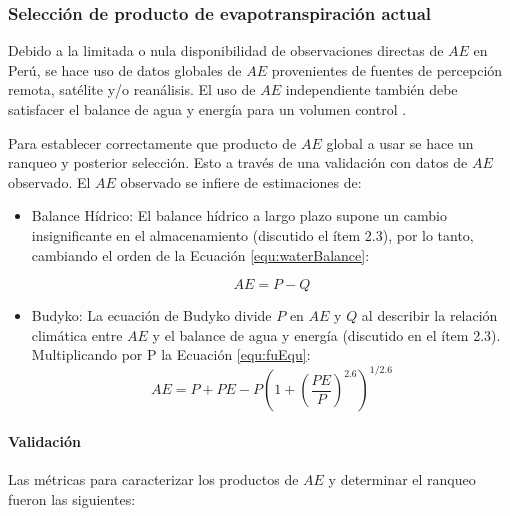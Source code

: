 \documentclass[12pt]{article}
\begin{document}
\clearpage


\thispagestyle{empty}

\subsubsection{Selección de producto de evapotranspiración actual}

Debido a la limitada o nula disponibilidad de observaciones directas de $AE$ en Perú, se hace uso de datos globales de $AE$ provenientes de fuentes de percepción remota, satélite y/o reanálisis. El uso de $AE$ independiente también debe satisfacer el balance de agua y energía para un volumen control \citep{Singh2015}.

Para establecer correctamente que producto de $AE$ global a usar se hace un ranqueo y posterior selección. Esto a través de una validación con datos de $AE$ observado. El $AE$ observado se infiere de estimaciones de:

\begin{itemize}

	\item Balance Hídrico: El balance hídrico a largo plazo supone un cambio insignificante en el almacenamiento (discutido el ítem 2.3), por lo tanto, cambiando el orden de la Ecuación \ref{equ:waterBalance}:
	
	\begin{equation}
    AE = P - Q
    \label{equ:bheq}
    \end{equation}

	\item Budyko: La ecuación de Budyko divide $P$ en $AE$ y $Q$ al describir la relación climática entre $AE$ y el balance de agua y energía (discutido en el ítem 2.3). Multiplicando por P la Ecuación \ref{equ:fuEqu}:
    \begin{equation}
    AE = P + PE - P\left (1 + \left ( \frac{PE}{P} \right )^{2.6}  \right )^{1/2.6}
    \end{equation}
	
\end{itemize}


\paragraph{Validación}\mbox{}

Las métricas para caracterizar los productos de $AE$ y determinar el ranqueo fueron las siguientes:
\end{document}
